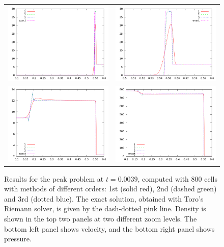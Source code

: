 \documentclass[10pt]{article}
\begin{document}
\begin{figure}[h]
  \begin{center}
	\begin{tabular}{cc}
      \includegraphics[width=.4\textwidth]{den_T9.png} &
	  \includegraphics[width=.4\textwidth]{denT9zoom.png} \\
	  \includegraphics[width=.4\textwidth]{vel_T9.png} &	
      \includegraphics[width=.4\textwidth]{prs_T9.png}\\
	\end{tabular}	
  \end{center}
  \caption{Results for the peak problem at $t=0.0039$, computed with 800 cells with methods of different orders: 1st (solid red), 2nd (dashed green) and 3rd (dotted blue). The exact solution, obtained with Toro's Riemann solver, is given by the dash-dotted pink line. Density is shown in the top two panels at two different zoom levels. The bottom left panel shows velocity, and the bottom right panel shows pressure.}
\end{figure}
\end{document}
